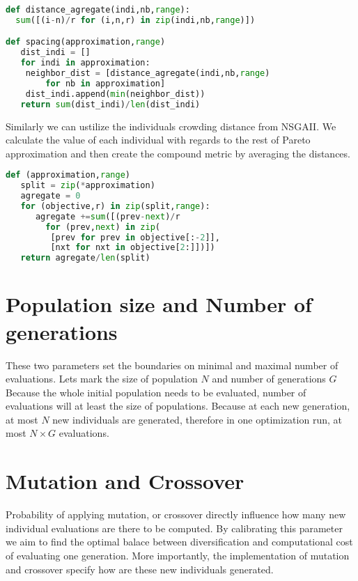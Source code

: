 \documentclass[12pt,oneside]{fithesis2}
\begin{document}
\begin{lstlisting}[language=Python,label=space_example,caption=Spacing indicator implementation]
def distance_agregate(indi,nb,range):
  sum([(i-n)/r for (i,n,r) in zip(indi,nb,range)])

def spacing(approximation,range)
   dist_indi = []
   for indi in approximation:
	neighbor_dist = [distance_agregate(indi,nb,range) 
		for nb in approximation]
	dist_indi.append(min(neighbor_dist))
   return sum(dist_indi)/len(dist_indi)
\end{lstlisting}

Similarly we can ustilize the individuals crowding distance from NSGAII. We calculate the value of each individual with regards to the rest of Pareto approximation and then create the compound metric by averaging the distances.

\begin{lstlisting}[language=Python,label=space_example,caption=Spacing indicator implementation]
def (approximation,range)
   split = zip(*approximation)
   agregate = 0
   for (objective,r) in zip(split,range):
      agregate +=sum([(prev-next)/r 
        for (prev,next) in zip(
         [prev for prev in objective[:-2]],
         [nxt for nxt in objective[2:]])])
   return agregate/len(split)
\end{lstlisting}


\section{Population size and Number of generations}
These two parameters set the boundaries on minimal and maximal number of evaluations. Lets mark the size of population $N$ and number of generations $G$ Because the whole initial population needs to be evaluated, number of evaluations will at least the size of populations.
Because at each new generation, at most $N$ new individuals are generated, therefore in one optimization run, at most $N \times G$ evaluations.

\section{Mutation and Crossover}
Probability of applying mutation, or crossover directly influence how many new individual evaluations are there to be computed. By calibrating this parameter we aim to find the optimal balace between diversification and computational cost of evaluating one generation. More importantly, the implementation of mutation and crossover specify how are these new individuals generated. 
\end{document}
